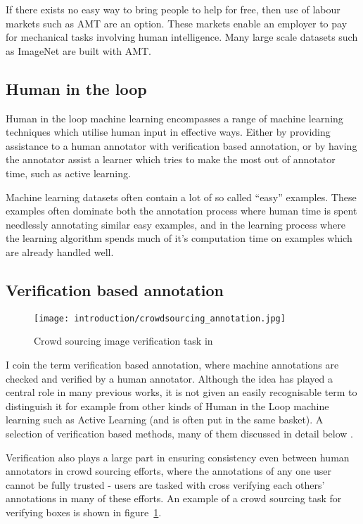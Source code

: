 If there exists no easy way to bring people to help for free, then use of labour markets such as \gls{AMT} are an option. These markets enable an employer to pay for mechanical tasks involving human intelligence. Many large scale datasets such as ImageNet \cite{Russakovsky2015} are built with \gls{AMT}. 


\subsection{Human in the loop}

Human in the loop machine learning encompasses a range of machine learning techniques which utilise human input in effective ways. Either by providing assistance to a human annotator with verification based annotation, or by having the annotator assist a learner which tries to make the most out of annotator time, such as active learning.

Machine learning datasets often contain a lot of so called ``easy'' examples. These examples often dominate both the annotation process where human time is spent needlessly annotating similar easy examples, and in the learning process where the learning algorithm spends much of it's computation time on examples which are already handled well. 


\subsection{Verification based annotation}

\begin{figure}[h]
  \centering
  \texttt{[image: introduction/crowdsourcing\_annotation.jpg]}
  \caption{Crowd sourcing image verification task in \cite{Su2012a}} 
  \label{fig:crowdsourcing}
\end{figure}

I coin the term verification based annotation, where machine annotations are checked and verified by a human annotator. Although the idea has played a central role in many previous works, it is not given an easily recognisable term to distinguish it for example from other kinds of Human in the Loop machine learning such as Active Learning (and is often put in the same basket). A selection of verification based methods, many of them discussed in detail below \cite{Yao2012, McNeill2011, Adhikaria2018, Castrejon2017, Papadopoulos2016, Russakovsky2015a}. 

Verification also plays a large part in ensuring consistency even between human annotators in crowd sourcing efforts, where the annotations of any one user cannot be fully trusted - users are tasked with cross verifying each others' annotations in many of these efforts. An example of a crowd sourcing task \cite{Su2012a} for verifying boxes is shown in figure~\ref{fig:crowdsourcing}.

